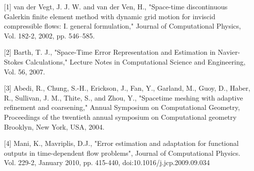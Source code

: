 \documentclass{report}
\begin{document}
[1] van der Vegt, J. J. W. and van der Ven, H., "Space-time discontinuous
Galerkin finite element method with dynamic grid motion for inviscid
compressible flows: I. general formulation," Journal of Computational
Physics, Vol. 182-2, 2002, pp. 546--585.

[2] Barth, T. J., "Space-Time Error Representation and Estimation in
Navier-Stokes Calculations," Lecture Notes in Computational Science and
Engineering, Vol. 56, 2007.

[3] Abedi, R., Chung, S.-H., Erickson, J., Fan, Y., Garland, M., Guoy,
D., Haber, R., Sullivan, J. M., Thite, S., and Zhou, Y., "Spacetime
meshing with adaptive refinement and coarsening," Annual Symposium on
Computational Geometry, Proceedings of the twentieth annual symposium on
Computational geometry Brooklyn, New York, USA, 2004.

[4] Mani, K., Mavriplis, D.J., "Error estimation and adaptation for
functional outputs in time-dependent flow problems", Journal of
Computational Physics. Vol. 229-2, January 2010, pp. 415-440,
doi:10.1016/j.jcp.2009.09.034
\end{document}
